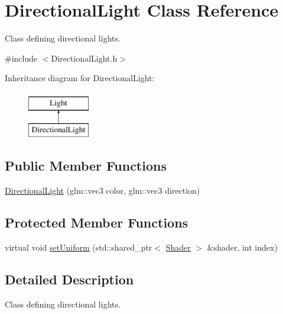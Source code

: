 \hypertarget{class_directional_light}{}\section{Directional\+Light Class Reference}
\label{class_directional_light}


Class defining directional lights.  




{\ttfamily \#include $<$Directional\+Light.\+h$>$}

Inheritance diagram for Directional\+Light\+:\begin{figure}[H]
\begin{center}
\leavevmode
\includegraphics[height=2.000000cm]{class_directional_light}
\end{center}
\end{figure}
\subsection*{Public Member Functions}
\begin{DoxyCompactItemize}
\item 
\mbox{\hyperlink{class_directional_light_aaeeb1532c03c9ea6b3f4a8d4c6407f04}{Directional\+Light}} (glm\+::vec3 color, glm\+::vec3 direction)
\end{DoxyCompactItemize}
\subsection*{Protected Member Functions}
\begin{DoxyCompactItemize}
\item 
virtual void \mbox{\hyperlink{class_directional_light_a81d638a84a99683bf260efd871fdf1e2}{set\+Uniform}} (std\+::shared\+\_\+ptr$<$ \mbox{\hyperlink{class_shader}{Shader}} $>$ \&shader, int index)
\end{DoxyCompactItemize}


\subsection{Detailed Description}
Class defining directional lights. 



